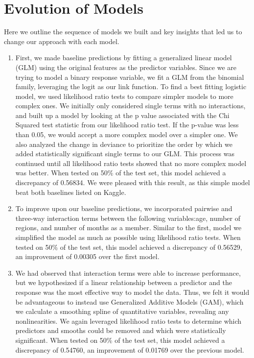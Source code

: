 \documentclass[11pt, oneside]{article}   	%
\begin{document}
\section*{Evolution of Models}
Here we outline the sequence of models we built and key insights that led us to change our approach with each model.
\begin{enumerate}
  \item 
  First, we made baseline predictions by fitting a generalized linear model (GLM) using the original features as the predictor variables.  Since we are trying to model a binary response variable, we fit a GLM from the binomial family, leveraging the logit as our link function. To find a best fitting logistic model, we used likelihood ratio tests to compare simpler models to more complex ones. We initially only considered single terms with no interactions, and built up a model by looking at the p value associated with the Chi Squared test statistic from our likelihood ratio test. If the p-value was less than 0.05, we would accept a more complex model over a simpler one. We also analyzed the change in deviance to prioritize the order by which we added statistically significant single terms to our GLM. This process was continued until all likelihood ratio tests showed that no more complex model was better.  When tested on 50\% of the test set, this model achieved a discrepancy of 0.56834. We were pleased with this result, as this simple model beat both baselines listed on Kaggle. 
  \item
  To improve upon our baseline predictions, we incorporated pairwise and three-way interaction terms between the following variables:age, number of regions, and number of months as a member.  Similar to the first, model we simplified the model as much as possible using likelihood ratio tests.  When tested on 50\% of the test set, this model achieved a discrepancy of 0.56529, an improvement of 0.00305 over the first model.
  \item
  We had observed that interaction terms were able to increase performance, but we hypothesized if a linear relationship between a predictor and the response was the most effective way to model the data. Thus, we felt it would be advantageous to instead use Generalized Additive Models (GAM), which we calculate a smoothing spline of quantitative variables, revealing any nonlinearities.  We again leveraged likelihood ratio tests to determine which predictors and smooths could be removed and which were statistically significant. When tested on 50\% of the test set, this model achieved a discrepancy of 0.54760, an improvement of 0.01769 over the previous model. 

\end{enumerate}
\end{document}
